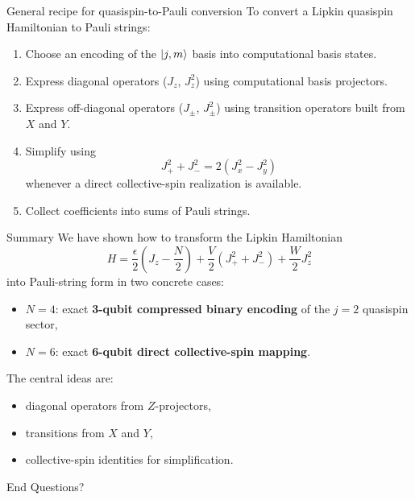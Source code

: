 \documentclass[aspectratio=169]{beamer}
\begin{document}
\begin{frame}{General recipe for quasispin-to-Pauli conversion}
To convert a Lipkin quasispin Hamiltonian to Pauli strings:

\begin{enumerate}
\item Choose an encoding of the \(\ket{j,m}\) basis into computational basis states.
\item Express diagonal operators (\(J_z\), \(J_z^2\)) using computational basis projectors.
\item Express off-diagonal operators (\(J_\pm\), \(J_\pm^2\)) using transition operators built from \(X\) and \(Y\).
\item Simplify using
\[
J_+^2+J_-^2 = 2(J_x^2-J_y^2)
\]
whenever a direct collective-spin realization is available.
\item Collect coefficients into sums of Pauli strings.
\end{enumerate}
\end{frame}

\begin{frame}{Summary}
We have shown how to transform the Lipkin Hamiltonian
\[
H = \frac{\epsilon}{2}\left(J_z-\frac{N}{2}\right)
+ \frac{V}{2}(J_+^2+J_-^2)
+ \frac{W}{2}J_z^2
\]
into Pauli-string form in two concrete cases:

\begin{itemize}
\item \(N=4\): exact \textbf{3-qubit compressed binary encoding} of the \(j=2\) quasispin sector,
\item \(N=6\): exact \textbf{6-qubit direct collective-spin mapping}.
\end{itemize}

The central ideas are:
\begin{itemize}
\item diagonal operators from \(Z\)-projectors,
\item transitions from \(X\) and \(Y\),
\item collective-spin identities for simplification.
\end{itemize}
\end{frame}

\begin{frame}{End}
\centering
{\Large Questions?}
\end{frame}
\end{document}
